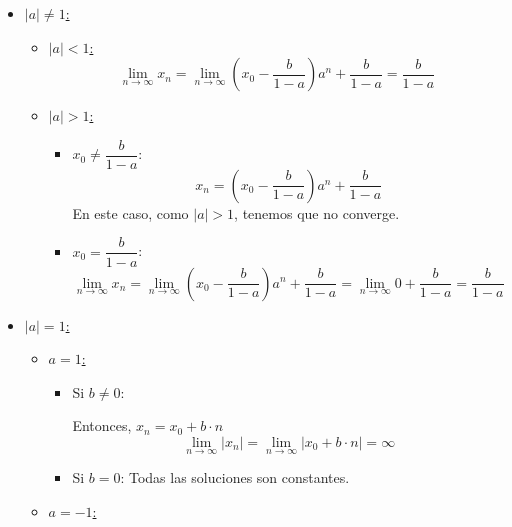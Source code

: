 \begin{itemize}
    \item \ul{$|a| \neq 1$:}
    \begin{itemize}
        \item \ul{$|a| < 1$:}
        \begin{equation*}
            \lim_{n\to \infty} x_n 
            = \lim_{n\to \infty}\left( x_0 - \dfrac{b}{1-a} \right)a^n + \dfrac{b}{1-a} = \frac{b}{1-a}
        \end{equation*}
        \item \ul{$|a| > 1$:}
        \begin{itemize}
            \item $x_0 \neq \dfrac{b}{1-a}$:
                \begin{equation*}
                   x_n = \left( x_0 - \dfrac{b}{1-a} \right)a^n + \dfrac{b}{1-a}
                \end{equation*}
                En este caso, como $|a|>1$, tenemos que no converge.
            \item $x_0 = \dfrac{b}{1-a}$:
            \begin{equation*}
                    \lim_{n \to \infty} x_n = \lim_{n\to \infty}\left( x_0 - \dfrac{b}{1-a} \right)a^n + \dfrac{b}{1-a} = \lim_{n\to \infty} 0 + \dfrac{b}{1-a} = \dfrac{b}{1-a}
                \end{equation*}
        \end{itemize}
            
    \end{itemize}
    \item \ul{$|a| = 1$:}
    \begin{itemize}
        \item \ul{$a = 1$:}
        \begin{itemize}
            \item Si $b \neq 0$:
            
            Entonces, $x_n = x_0 + b \cdot n$
            \begin{equation*}
                \lim_{n \to \infty} |x_n| = \lim_{n \to \infty} |x_0+b\cdot n| = \infty
            \end{equation*}

            \item Si $b = 0$:
            Todas las soluciones son constantes.
        \end{itemize}
        \item \ul{$a = -1$:}


\end{itemize}
\end{itemize}

